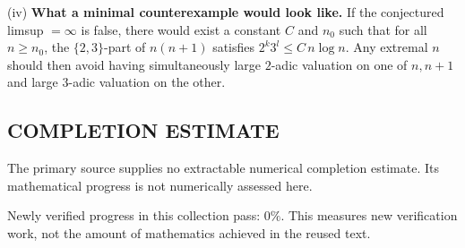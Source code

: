 (iv) \textbf{What a minimal counterexample would look like.}
If the conjectured limsup $=\infty$ is false, there would exist a constant $C$ and $n_0$ such that for all $n\ge n_0$, the $\{2,3\}$-part of $n(n+1)$ satisfies $2^k3^l\le C\,n\log n$. Any extremal $n$ should then avoid having simultaneously large $2$-adic valuation on one of $n,n+1$ and large $3$-adic valuation on the other.




\subsection*{COMPLETION ESTIMATE}
The primary source supplies no extractable numerical completion estimate. Its mathematical progress is not numerically assessed here.

Newly verified progress in this collection pass: $0\%$. This measures new verification work, not the amount of mathematics achieved in the reused text.
